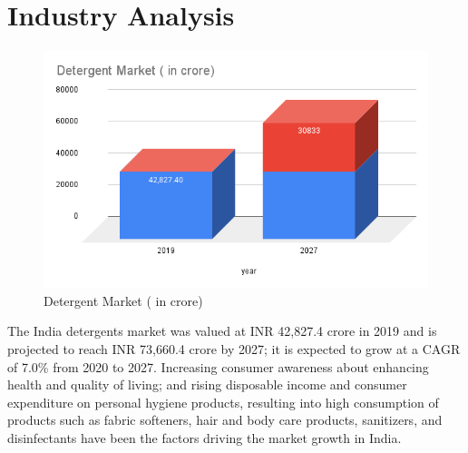 \newpage 
\section{Industry Analysis}
\begin{figure}
    \centering
    \includegraphics[width=0.9\linewidth]{images/Detergent Market.png}
    \caption{Detergent Market ( in crore)}
    \label{fig:hul_logo}
\end{figure}
The India detergents market was valued at INR 42,827.4 crore in 2019 and is projected to reach INR 73,660.4 crore by 2027; it is expected to grow at a CAGR of 7.0\% from 2020 to 2027. Increasing consumer awareness about enhancing health and quality of living; and rising disposable income and consumer expenditure on personal hygiene products, resulting into high consumption of products such as fabric softeners, hair and body care products, sanitizers, and disinfectants have been the factors driving the market growth in India.

